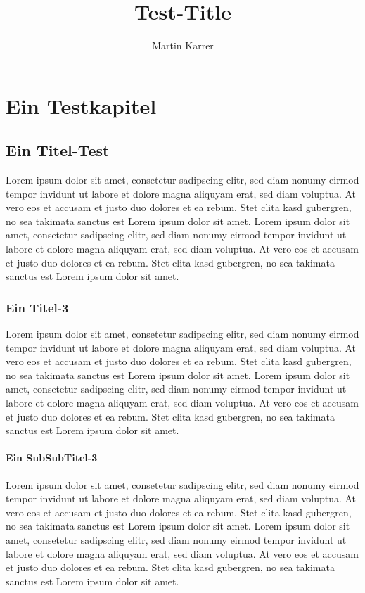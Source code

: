 \documentclass[10pt,a4paper]{report}
\author{Martin Karrer}
\title{Test-Title}
\begin{document}
\maketitle

\tableofcontents \newpage
\chapter{Ein Testkapitel}
\section{Ein Titel-Test}
Lorem ipsum dolor sit amet, consetetur sadipscing elitr, sed diam nonumy eirmod tempor invidunt ut labore et dolore magna aliquyam erat, sed diam voluptua. At vero eos et accusam et justo duo dolores et ea rebum. Stet clita kasd gubergren, no sea takimata sanctus est Lorem ipsum dolor sit amet. Lorem ipsum dolor sit amet, consetetur sadipscing elitr, sed diam nonumy eirmod tempor invidunt ut labore et dolore magna aliquyam erat, sed diam voluptua. At vero eos et accusam et justo duo dolores et ea rebum. Stet clita kasd gubergren, no sea takimata sanctus est Lorem ipsum dolor sit amet.
\subsection{Ein Titel-3}
Lorem ipsum dolor sit amet, consetetur sadipscing elitr, sed diam nonumy eirmod tempor invidunt ut labore et dolore magna aliquyam erat, sed diam voluptua. At vero eos et accusam et justo duo dolores et ea rebum. Stet clita kasd gubergren, no sea takimata sanctus est Lorem ipsum dolor sit amet. Lorem ipsum dolor sit amet, consetetur sadipscing elitr, sed diam nonumy eirmod tempor invidunt ut labore et dolore magna aliquyam erat, sed diam voluptua. At vero eos et accusam et justo duo dolores et ea rebum. Stet clita kasd gubergren, no sea takimata sanctus est Lorem ipsum dolor sit amet.
\subsubsection{Ein SubSubTitel-3}
Lorem ipsum dolor sit amet, consetetur sadipscing elitr, sed diam nonumy eirmod tempor invidunt ut labore et dolore magna aliquyam erat, sed diam voluptua. At vero eos et accusam et justo duo dolores et ea rebum. Stet clita kasd gubergren, no sea takimata sanctus est Lorem ipsum dolor sit amet. Lorem ipsum dolor sit amet, consetetur sadipscing elitr, sed diam nonumy eirmod tempor invidunt ut labore et dolore magna aliquyam erat, sed diam voluptua. At vero eos et accusam et justo duo dolores et ea rebum. Stet clita kasd gubergren, no sea takimata sanctus est Lorem ipsum dolor sit amet.
\end{document}

